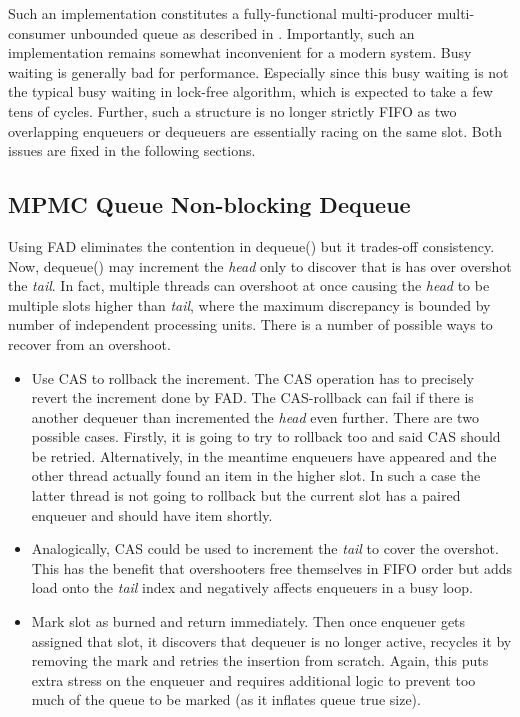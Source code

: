 \documentclass[12pt,a4paper,twoside]{report}
\begin{document}
Such an implementation constitutes a fully-functional multi-producer multi-consumer unbounded queue as described in \cite{Kappes2021}. Importantly, such an implementation remains somewhat inconvenient for a modern system. Busy waiting is generally bad for performance. Especially since this busy waiting is not the typical busy waiting in lock-free algorithm, which is expected to take a few tens of cycles. Further, such a structure is no longer strictly FIFO as two overlapping enqueuers or dequeuers are essentially racing on the same slot. Both issues are fixed in the following sections. 

\subsection{MPMC Queue Non-blocking Dequeue}

Using FAD eliminates the contention in dequeue() but it trades-off consistency. Now, dequeue() may increment the \textit{head} only to discover that is has over overshot the \textit{tail}. In fact, multiple threads can overshoot at once causing the \textit{head} to be multiple slots higher than \textit{tail}, where the maximum discrepancy is bounded by number of independent processing units. There is a number of possible ways to recover from an overshoot.

\begin{itemize}
    \item Use CAS to rollback the increment. The CAS operation has to precisely revert the increment done by FAD. The CAS-rollback can fail if there is another dequeuer than incremented the \textit{head} even further. There are two possible cases. Firstly, it is going to try to rollback too and said CAS should be retried. Alternatively, in the meantime enqueuers have appeared and the other thread actually found an item in the higher slot. In such a case the latter thread is not going to rollback but the current slot has a paired enqueuer and should have item shortly. 
    \item Analogically, CAS could be used to increment the \textit{tail} to cover the overshot. This has the benefit that overshooters free themselves in FIFO order but adds load onto the \textit{tail} index and negatively affects enqueuers in a busy loop.
    \item Mark slot as burned and return immediately. Then once enqueuer gets assigned that slot, it discovers that dequeuer is no longer active, recycles it by removing the mark and retries the insertion from scratch. Again, this puts extra stress on the enqueuer and requires additional logic to prevent too much of the queue to be marked (as it inflates queue true size).  
\end{itemize}
\end{document}
